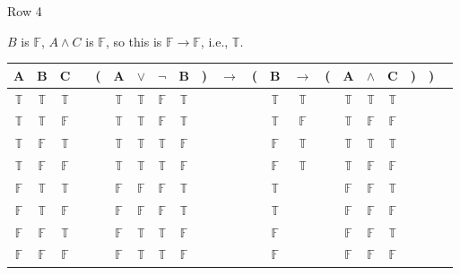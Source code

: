 \documentclass[
  ignorenonframetext,
]{beamer}
\renewcommand{\,}{\text{, }}
\def\True{\mathbb{T}}
\def\False{\mathbb{F}}
\begin{document}
\begin{frame}{Row 4}
\protect\hypertarget{row-4}{}

\(B\) is \(\False\), \(A \wedge C\) is \(\False\), so this is
\(\False \rightarrow \False\), i.e., \(\True\).

\begin{center}
\bigskip
\begin{tabular}{@{ }c@{ }@{ }c@{ }@{ }c | c@{ }@{}c@{}@{ }c@{ }@{ }c@{ }@{ }c@{ }@{ }c@{ }@{}c@{}@{ }c@{ }@{}c@{}@{ }c@{ }@{ }c@{ }@{}c@{}@{ }c@{ }@{ }c@{ }@{ }c@{ }@{}c@{}@{}c@{}@{ }c}
A & B & C &  & ( & A & $\vee$ & $\neg$ & B & ) & $\rightarrow$ & ( & B & $\rightarrow$ & ( & A & $\wedge$ & C & ) & ) & \\
\hline 
 $\True$ & $\True$ & $\True$ &  &  & $\True$ & $\True$ & $\False$ & $\True$ &  &&  & $\True$ & $\True$ &  & $\True$ & $\True$ & $\True$ &  &  & \\
 $\True$ & $\True$ & $\False$ &  &  & $\True$ & $\True$ & $\False$ & $\True$ &  &&  & $\True$ & $\False$ &  & $\True$ & $\False$ & $\False$ &  &  & \\
 $\True$ & $\False$ & $\True$ &  &  & $\True$ & $\True$ & $\True$ & $\False$ &  &&  & $\False$ & $\True$ &  & $\True$ & $\True$ & $\True$ &  &  & \\
 $\True$ & $\False$ & $\False$ &  &  & $\True$ & $\True$ & $\True$ & $\False$ &  &&  & $\False$ & $\True$ &  & $\True$ & $\False$ & $\False$ &  &  & \\
 $\False$ & $\True$ & $\True$ &  &  & $\False$ & $\False$ & $\False$ & $\True$ &  &&  & $\True$ &&  & $\False$ & $\False$ & $\True$ &  &  & \\
 $\False$ & $\True$ & $\False$ &  &  & $\False$ & $\False$ & $\False$ & $\True$ &  &&  & $\True$ &&  & $\False$ & $\False$ & $\False$ &  &  & \\
 $\False$ & $\False$ & $\True$ &  &  & $\False$ & $\True$ & $\True$ & $\False$ &  &&  & $\False$ &&  & $\False$ & $\False$ & $\True$ &  &  & \\
 $\False$ & $\False$ & $\False$ &  &  & $\False$ & $\True$ & $\True$ & $\False$ &  &&  & $\False$ &&  & $\False$ & $\False$ & $\False$ &  &  & \\
\end{tabular}
\bigskip
\end{center}

\end{frame}
\end{document}
